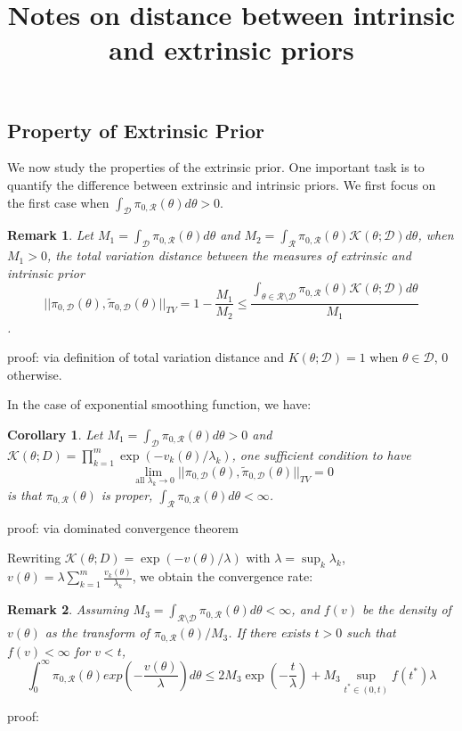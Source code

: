 \documentclass[10pt]{article}
\title{\textbf{Notes on distance between intrinsic and extrinsic priors}}
\author{}
\date{}
\newtheorem{corollary}{Corollary}
\newtheorem{remark}{Remark}
\newcommand{\mc}[1]{\mathcal{#1}}
\DeclareMathOperator{\1}{\mathbbm{1}}
\begin{document}
\maketitle

\subsection{Property of Extrinsic Prior}

We now study the properties of the extrinsic prior. One important task is to quantify the difference between extrinsic and intrinsic priors. We first focus on the first case when $\int_{\mc D} \pi_{0,\mc R}(\theta)d\theta>0$.

\begin{remark}
Let $M_1= \int_{\mc D} \pi_{0,\mc R}(\theta)d\theta$ and $M_2 = \int_{\mc R} \pi_{0,\mc R}(\theta) \mc K(\theta;\mc D)d\theta$, when $M_1>0$, the total variation distance between the measures of extrinsic and intrinsic prior
$$||\pi_{0,\mc D}(\theta), \tilde{\pi}_{0,\mc D}(\theta) ||_{TV} = 1 - \frac{M_1}{M_2} \le \frac{\int_{\theta  \in \mc R \setminus \mc D} \pi_{0,\mc R}(\theta) \mc K(\theta;\mc D)d\theta}{M_1}$$.
\end{remark}
proof:
{via definition of total variation distance and $K(\theta;\mc D)=1$ when $\theta\in\mc D$, $0$ otherwise.}


In the case of exponential smoothing function, we have:
\begin{corollary}
Let $M_1= \int_{\mc D} \pi_{0,\mc R}(\theta)d\theta>0$ and $\mc K(\theta; D) = \prod_{k=1}^m \exp( -v_k(\theta)/\lambda_k)$, one sufficient condition to have
$$\lim_{\text{ all } \lambda_k\rightarrow 0}||\pi_{0,\mc D}(\theta), \tilde{\pi}_{0,\mc D}(\theta) ||_{TV} = 0$$
is that $\pi_{0,\mc R}(\theta)$ is proper, $\int_{\mc R} \pi_{0,\mc R}(\theta) d\theta<\infty$.
\end{corollary}
proof:
{via dominated convergence theorem}

Rewriting $\mc K(\theta; D) = \exp(-v(\theta)/\lambda)$ with $\lambda = \sup_k \lambda_k$, $v(\theta)=\lambda\sum_{k=1}^m\frac{ v_k(\theta)}{\lambda_k}$, we obtain the convergence rate:

\begin{remark}
Assuming $M_3= \int_{\mc R \setminus \mc D} \pi_{0,\mc R}(\theta) d\theta<\infty$, and $f(v)$ be the density of $v(\theta)$ as the transform of $\pi_{0,\mc R}(\theta)/M_3$. If there exists $t>0$ such that $f(v) < \infty$ for $v<t$,
$$\int_0^\infty {\pi_{0,\mc R}(\theta)}exp(- \frac{v(\theta)}{\lambda}) d \theta \le 
2 {M_3} \exp(-\frac{t}{\lambda}) + {M_3} \sup_{t^*\in(0,t)} {f(t^*)}\lambda 
$$
\end{remark}
proof:
\end{document}
